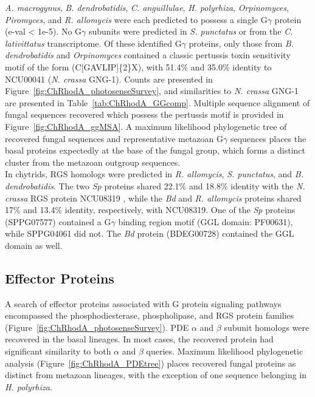\indent \textit{A. macrogynus}, \textit{B. dendrobatidis}, \textit{C. anguillulae}, \textit{H. polyrhiza}, \textit{Orpinomyces}, \textit{Piromyces}, and \textit{R. allomycis} were each predicted to possess a single G$\gamma$ protein (e-val < 1e-5). No G$\gamma$ subunits were predicted in \textit{S. punctatus} or from the \textit{C. lativittatus} transcriptome. Of these identified G$\gamma$ proteins, only those from \textit{B. dendrobatidis} and \textit{Orpinomyces} contained a classic pertussis toxin sensitivity motif of the form (C[GAVLIP]\{2\}X), with 51.4\% and 35.0\% identity to NCU00041 (\textit{N. crassa} GNG-1). Counts are presented in Figure~\ref{fig:ChRhodA_photosenseSurvey}, and similarities to \textit{N. crassa} GNG-1 are presented in Table~\ref{tab:ChRhodA_GGcomp}. Multiple sequence alignment of fungal sequences recovered which possess the pertussis motif is provided in Figure~\ref{fig:ChRhodA_ggMSA}. A maximum likelihood phylogenetic tree of recovered fungal sequences and representative metazoan G$\gamma$ sequences places the basal proteins expectedly at the base of the fungal group, which forms a distinct cluster from the metazoan outgroup sequences.\\

\indent In chytrids, RGS homologs were predicted in \textit{R. allomycis}, \textit{S. punctatus}, and \textit{B. dendrobatidis}. The two \textit{Sp} proteins shared 22.1\% and 18.8\% identity with the \textit{N. crassa} RGS protein NCU08319 \cite{Borkovich2004}, while the \textit{Bd} and \textit{R. allomycis} proteins shared 17\% and 13.4\% identity, respectively, with NCU08319. One of the \textit{Sp} proteins (SPPG07577) contained a G$\gamma$ binding region motif (GGL domain: PF00631), while SPPG04061 did not. The \textit{Bd} protein (BDEG00728) contained the GGL domain as well.\\

\subsection*{Effector Proteins}
A search of effector proteins associated with G protein signaling pathways encompassed the phosphodiesterase, phospholipase, 
and RGS protein families (Figure~\ref{fig:ChRhodA_photosenseSurvey}). PDE $\alpha$ and $\beta$ subunit homologs were recovered 
in the basal lineages. In most cases, the recovered protein had significant similarity to both $\alpha$ and $\beta$ queries. 
Maximum likelihood phylogenetic analysis (Figure~\ref{fig:ChRhodA_PDEtree}) places recovered fungal proteins as distinct from metazoan lineages, with the exception of one sequence belonging in \textit{H. polyrhiza}.\\ 


